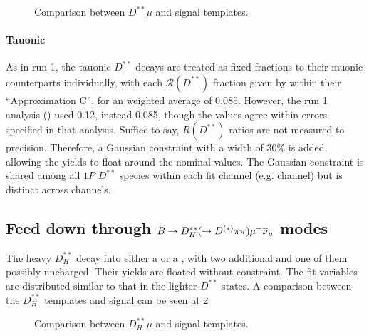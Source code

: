 \begin{figure}[htb]

    \caption{Comparison between $D^{**}\mu$ and \Dz\taum signal templates.}
    \label{fig:dstst-mu-vs-d0-sig}
\end{figure}

\paragraph{Tauonic}
As in run 1, the tauonic $D^{**}$ decays are treated as fixed fractions
to their muonic counterparts individually, with each $\mathcal{R}(D^{**})$
fraction given by \cite{Bernlochner_2018} within their ``Approximation C'',
for an weighted average of 0.085.
However, the run 1 \RDst analysis (\cite{LHCb-ANA-2014-052}) used
0.12, instead 0.085,
though the values agree within errors specified in that analysis.
Suffice to say, $R(D^{**})$ ratios are not measured to precision.
Therefore, a Gaussian constraint with a width of 30\% is added,
allowing the yields to float around the nominal values.
The Gaussian constraint is shared among all $1P$ $D^{**}$ species within
each fit channel (e.g. \Dz channel) but is distinct across channels.


\subsection{Feed down through $B \rightarrow D_H^{**}(\rightarrow D^{(*)}\pi\pi){\mu^-}{{\overline{\nu}}_\mu}$ modes}

The heavy $D_H^{**}$ decay into either a \Dz or a \Dstar, with two additional
\pion and one of them possibly uncharged.
Their yields are floated without constraint.
The fit variables are distributed similar to that in the lighter
$D^{**}$ states.
A comparison between the $D_H^{**}$ templates and \Dz\taum signal can be
seen at \ref{fig:dstst-heavy-vs-d0-sig}

\begin{figure}[htb]

    \caption{Comparison between $D_H^{**}\mu$ and \Dz\taum signal templates.}
    \label{fig:dstst-heavy-vs-d0-sig}
\end{figure}


